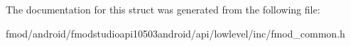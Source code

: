 The documentation for this struct was generated from the following file\+:\begin{DoxyCompactItemize}
\item 
fmod/android/fmodstudioapi10503android/api/lowlevel/inc/fmod\+\_\+common.\+h\end{DoxyCompactItemize}
